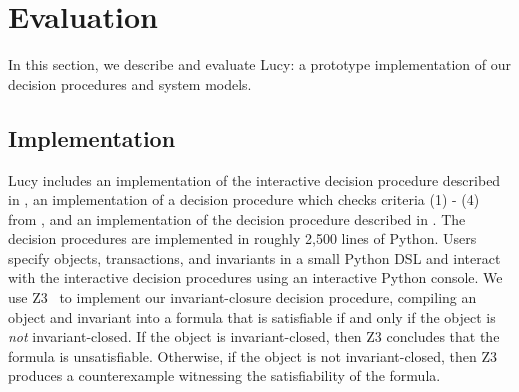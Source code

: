 \section{Evaluation}
In this section, we describe and evaluate Lucy: a prototype implementation of
our decision procedures and system models.

\subsection{Implementation}
Lucy includes an implementation of the interactive decision procedure described
in , an implementation of a decision
procedure which checks criteria (1) - (4) from , and an
implementation of the decision procedure described in
. The decision procedures
are implemented in roughly 2,500 lines of Python. Users specify objects,
transactions, and invariants in a small Python DSL and interact with the
interactive decision procedures using an interactive Python console. We use
Z3~\cite{de2008z3} to implement our invariant-closure decision procedure,
compiling an object and invariant into a formula that is satisfiable if and
only if the object is \emph{not} invariant-closed. If the object is
invariant-closed, then Z3 concludes that the formula is unsatisfiable.
Otherwise, if the object is not invariant-closed, then Z3 produces a
counterexample witnessing the satisfiability of the formula.

